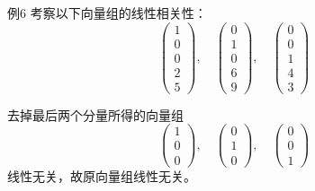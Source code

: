 \begin{frame}
  \begin{footnotesize}
    \begin{exampleblock}{例6}
      考察以下向量组的线性相关性：
      $$
      \left(
      \begin{array}{c}
        1\\
        0\\
        0\\
        2\\
        5
      \end{array}
      \right), \quad
      \left(
      \begin{array}{c}
        0\\
        1\\
        0\\
        6\\
        9
      \end{array}
      \right), \quad
      \left(
      \begin{array}{c}
        0\\
        0\\
        1\\
        4\\
        3
      \end{array}
      \right)
      $$
    \end{exampleblock}
    \pause
    \jiename
    去掉最后两个分量所得的向量组
      $$
      \left(
      \begin{array}{c}
        1\\
        0\\
        0
      \end{array}
      \right), \quad
      \left(
      \begin{array}{c}
        0\\
        1\\
        0
      \end{array}
      \right), \quad
      \left(
      \begin{array}{c}
        0\\
        0\\
        1
      \end{array}
      \right)
      $$
      线性无关，故原向量组线性无关。
  \end{footnotesize}
\end{frame}

